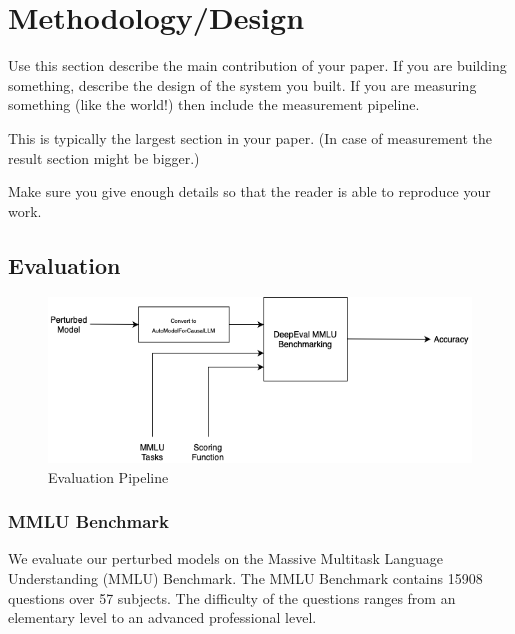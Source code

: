 \section{Methodology/Design}
\label{sec:methodology}

Use this section describe the main contribution of your paper. If you are
building something, describe the design of the system you built. If you are
measuring something (like the world!) then include the measurement pipeline.

This is typically the largest section in your paper. (In case of measurement the
result section might be bigger.)


Make sure you give enough details so that the reader is able to reproduce your
work.

\subsection{Evaluation}
\begin{figure}
    \centering
    \includegraphics[width=1.0\linewidth]{Course Project Template//images/evaluation-pipeline.png}
    \caption{Evaluation Pipeline}
    \label{fig:eval-pipeline}
\end{figure}
\subsubsection{MMLU Benchmark}
We evaluate our perturbed models on the Massive Multitask Language Understanding (MMLU) Benchmark. The MMLU Benchmark contains 15908 questions over 57 subjects. The difficulty of the questions ranges from an elementary level to an advanced professional level\cite{hendrycks2021measuringmassivemultitasklanguage}. 

